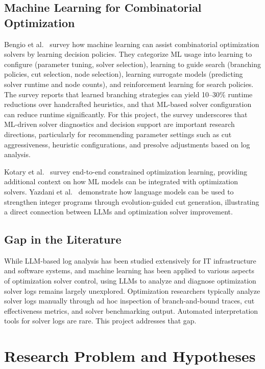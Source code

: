 \documentclass[11pt]{article}
\begin{document}
\subsection{Machine Learning for Combinatorial Optimization}

Bengio et al.\ \cite{bengio2018mlforcombinatorial} survey how machine learning can assist combinatorial optimization solvers by learning decision policies. They categorize ML usage 
into learning to configure (parameter tuning, solver selection), learning to guide search (branching policies, cut selection, node selection), learning surrogate models (predicting 
solver runtime and node counts), and reinforcement learning for search policies. The survey reports that learned branching strategies can yield 10--30\% runtime reductions over 
handcrafted heuristics, and that ML-based solver configuration can reduce runtime significantly. For this project, the survey underscores that ML-driven solver diagnostics and decision 
support are important research directions, particularly for recommending parameter settings such as cut aggressiveness, heuristic configurations, and presolve adjustments based on log analysis.

Kotary et al.\ \cite{kotary2021endtoend} survey end-to-end constrained optimization learning, providing additional context on how ML models can be integrated with optimization solvers. 
Yazdani et al.\ \cite{yazdani2025evocut} demonstrate how language models can be used to strengthen integer programs through evolution-guided cut generation, illustrating a direct connection 
between LLMs and optimization solver improvement.

\subsection{Gap in the Literature}

While LLM-based log analysis has been studied extensively for IT infrastructure and software systems, and machine learning has been applied to various aspects of optimization solver control, 
using LLMs to analyze and diagnose optimization solver logs remains largely unexplored. Optimization researchers typically analyze solver logs manually through ad hoc inspection of 
branch-and-bound traces, cut effectiveness metrics, and solver benchmarking output. Automated interpretation tools for solver logs are rare. This project addresses that gap.

\section{Research Problem and Hypotheses}
\label{sec:problem}
\end{document}
